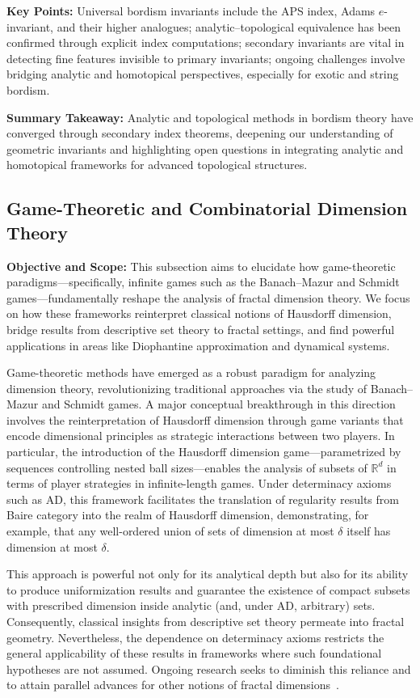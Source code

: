 \documentclass[sigconf]{acmart}
\begin{document}
\textbf{Key Points:} Universal bordism invariants include the APS index, Adams $e$-invariant, and their higher analogues; analytic–topological equivalence has been confirmed through explicit index computations; secondary invariants are vital in detecting fine features invisible to primary invariants; ongoing challenges involve bridging analytic and homotopical perspectives, especially for exotic and string bordism.

\textbf{Summary Takeaway:} Analytic and topological methods in bordism theory have converged through secondary index theorems, deepening our understanding of geometric invariants and highlighting open questions in integrating analytic and homotopical frameworks for advanced topological structures.

\subsection{Game-Theoretic and Combinatorial Dimension Theory}

\textbf{Objective and Scope:} This subsection aims to elucidate how game-theoretic paradigms—specifically, infinite games such as the Banach–Mazur and Schmidt games—fundamentally reshape the analysis of fractal dimension theory. We focus on how these frameworks reinterpret classical notions of Hausdorff dimension, bridge results from descriptive set theory to fractal settings, and find powerful applications in areas like Diophantine approximation and dynamical systems.

Game-theoretic methods have emerged as a robust paradigm for analyzing dimension theory, revolutionizing traditional approaches via the study of Banach–Mazur and Schmidt games. A major conceptual breakthrough in this direction involves the reinterpretation of Hausdorff dimension through game variants that encode dimensional principles as strategic interactions between two players. In particular, the introduction of the Hausdorff dimension game—parametrized by sequences controlling nested ball sizes—enables the analysis of subsets of $\mathbb{R}^d$ in terms of player strategies in infinite-length games. Under determinacy axioms such as AD, this framework facilitates the translation of regularity results from Baire category into the realm of Hausdorff dimension, demonstrating, for example, that any well-ordered union of sets of dimension at most $\delta$ itself has dimension at most $\delta$. 

This approach is powerful not only for its analytical depth but also for its ability to produce uniformization results and guarantee the existence of compact subsets with prescribed dimension inside analytic (and, under AD, arbitrary) sets. Consequently, classical insights from descriptive set theory permeate into fractal geometry. Nevertheless, the dependence on determinacy axioms restricts the general applicability of these results in frameworks where such foundational hypotheses are not assumed. Ongoing research seeks to diminish this reliance and to attain parallel advances for other notions of fractal dimensions~\cite{ref77}.
\end{document}

